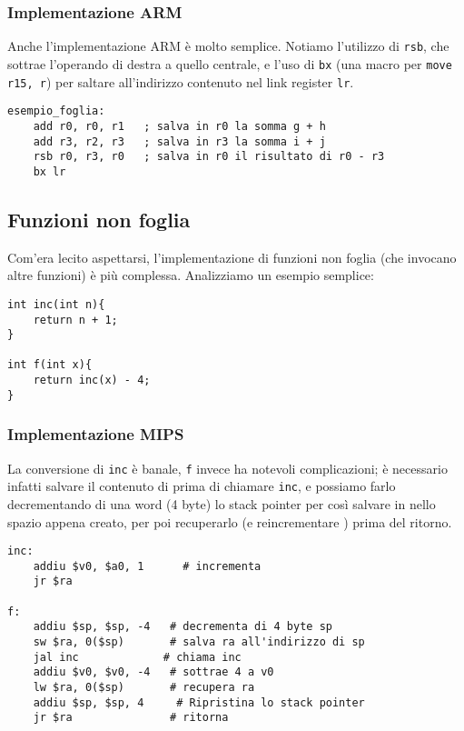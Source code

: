 \documentclass[class=book, crop=false, oneside]{standalone}
\begin{document}
\subsubsection{Implementazione ARM}
Anche l'implementazione ARM è molto semplice. Notiamo l'utilizzo di \texttt{rsb}, che sottrae l'operando di destra a quello centrale, e l'uso di \texttt{bx} (una macro per \texttt{move r15, r}) per saltare all'indirizzo contenuto nel link register \texttt{lr}.
\begin{verbatim}
esempio_foglia:
	add r0, r0, r1	 ; salva in r0 la somma g + h
	add r3, r2, r3	 ; salva in r3 la somma i + j
	rsb r0, r3, r0	 ; salva in r0 il risultato di r0 - r3
	bx lr
\end{verbatim}

\subsection*{Funzioni non foglia}
Com'era lecito aspettarsi, l'implementazione di funzioni non foglia (che invocano altre funzioni) è più complessa. Analizziamo un esempio semplice:
\begin{verbatim}
int inc(int n){
	return n + 1;
}

int f(int x){
	return inc(x) - 4;
}
\end{verbatim}

\subsubsection{Implementazione MIPS}
La conversione di \texttt{inc} è banale, \texttt{f} invece ha notevoli complicazioni; è necessario infatti salvare il contenuto di  prima di chiamare \texttt{inc}, e possiamo farlo decrementando di una word (4 byte) lo stack pointer per così salvare  in  nello spazio appena creato, per poi recuperarlo (e reincrementare ) prima del ritorno.
\begin{verbatim}
inc:
	addiu $v0, $a0, 1	   # incrementa
	jr $ra

f:
	addiu $sp, $sp, -4	 # decrementa di 4 byte sp
	sw $ra, 0($sp)	     # salva ra all'indirizzo di sp
	jal inc	            # chiama inc
	addiu $v0, $v0, -4	 # sottrae 4 a v0
	lw $ra, 0($sp)	     # recupera ra
	addiu $sp, $sp, 4	  # Ripristina lo stack pointer
	jr $ra	             # ritorna
\end{verbatim}
\end{document}
